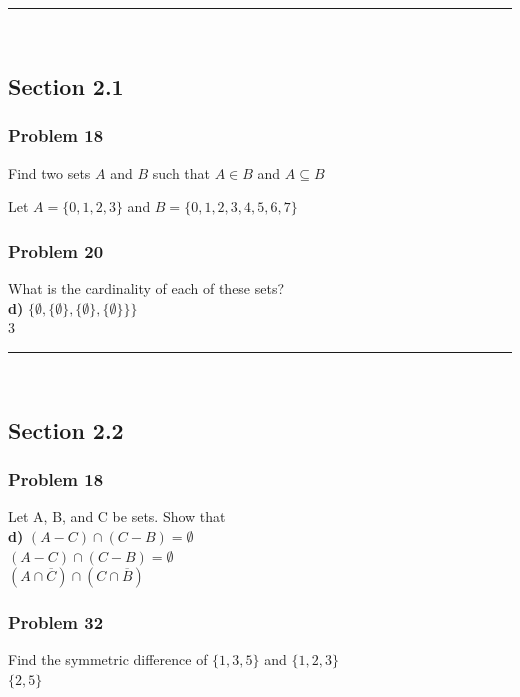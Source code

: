 \documentclass[paper=a4, fontsize=11pt]{scrartcl} %
\newcommand{\horrule}[1]{\rule{\linewidth}{#1}} %
\begin{document}

\horrule{0.5pt} \\ %
\subsection*{Section 2.1}
\subsubsection*{Problem 18}
Find two sets $A$ and $B$ such that $A \in B$ and $A \subseteq B$

Let $A = \{0,1,2,3\}$ and $B = \{0,1,2,3,4,5,6,7\}$\\
\subsubsection*{Problem 20}
What is the cardinality of each of these sets?\\
\textbf{d)} $\{\emptyset , \{\emptyset \}, \{\emptyset \}, \{\emptyset \}\}\}$\\
3

\horrule{0.5pt} \\ %
\subsection*{Section 2.2}
\subsubsection*{Problem 18}
Let A, B, and C be sets. Show that\\
\textbf{d)} $(A - C) \cap (C - B) = \emptyset$\\ 
$(A - C) \cap (C - B) = \emptyset$\\
$(A \cap \overline{C}) \cap (C \cap \overline{B})$\\

\subsubsection*{Problem 32}
Find the symmetric difference of $\{1, 3, 5\}$ and $\{1, 2, 3\}$\\
$\{2,5\}$\\
\end{document}
